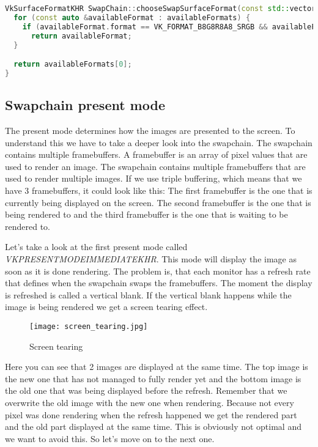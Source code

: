 \documentclass[12pt]{report} \usepackage{preamble}
\begin{document}
\begin{lstlisting}[language=C++]
VkSurfaceFormatKHR SwapChain::chooseSwapSurfaceFormat(const std::vector<VkSurfaceFormatKHR> &availableFormats) {
  for (const auto &availableFormat : availableFormats) {
    if (availableFormat.format == VK_FORMAT_B8G8R8A8_SRGB && availableFormat.colorSpace == VK_COLOR_SPACE_SRGB_NONLINEAR_KHR)
      return availableFormat;
  }

  return availableFormats[0];
}
\end{lstlisting}

\subsection{Swapchain present mode}

The present mode determines how the images are presented to the screen. To understand this we
have to take a deeper look into the swapchain. The swapchain contains multiple framebuffers.
A framebuffer is an array of pixel values that are used to render an image. The swapchain
contains multiple framebuffers that are used to render multiple images.
If we use triple buffering, which means that we have 3 framebuffers, it could look like this:
The first framebuffer is the one that is currently being displayed on the screen.
The second framebuffer is the one
that is being rendered to and the third framebuffer is the one that is waiting to be rendered to.

Let's take a look at the first present mode called \\
\textit{VK\textunderscore PRESENT\textunderscore MODE\textunderscore IMMEDIATE\textunderscore KHR}.
This mode will display the image as soon as it is done rendering.
The problem is, that each monitor has a refresh rate that defines when the swapchain
swaps the framebuffers. The moment the display is refreshed is called a vertical blank.
If the vertical blank happens while the image is being rendered we get a screen tearing effect.

\begin{figure}[htbp]
	\centering
	\texttt{[image: screen\_tearing.jpg]}
	\caption{Screen tearing} \cite{fig:screen_tearing}
\end{figure}

Here you can see that 2 images are displayed at the same time. The top image is the new one that has
not managed to fully render yet and the bottom image is the old one that was being displayed before the
refresh. Remember that we overwrite the old image with the new one when rendering. Because not every pixel
was done rendering when the refresh happened we get the rendered part and the old part displayed at the same time.
This is obviously not optimal and we want to avoid this. So let's move on to the next one.
\end{document}
